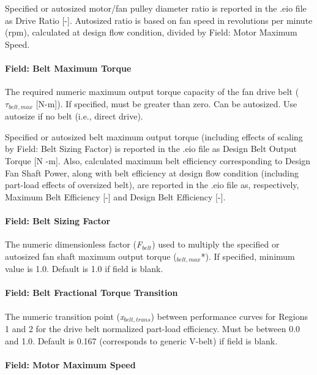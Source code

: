 Specified or autosized motor/fan pulley diameter ratio is reported in the .eio file as Drive Ratio {[}-{]}. Autosized ratio is based on fan speed in revolutions per minute (rpm), calculated at design flow condition, divided by Field: Motor Maximum Speed.

\paragraph{Field: Belt Maximum Torque}\label{field-belt-maximum-torque}

The required numeric maximum output torque capacity of the fan drive belt (\(\tau_{belt,max}\) {[}N-m{]}). If specified, must be greater than zero. Can be autosized. Use autosize if no belt (i.e., direct drive).

Specified or autosized belt maximum output torque (including effects of scaling by Field: Belt Sizing Factor) is reported in the .eio file as Design Belt Output Torque {[}N -m{]}. Also, calculated maximum belt efficiency corresponding to Design Fan Shaft Power, along with belt efficiency at design flow condition (including part-load effects of oversized belt), are reported in the .eio file as, respectively, Maximum Belt Efficiency {[}-{]} and Design Belt Efficiency {[}-{]}.

\paragraph{Field: Belt Sizing Factor}\label{field-belt-sizing-factor}

The numeric dimensionless factor (\emph{F\(_{belt}\)}) used to multiply the specified or autosized fan shaft maximum output torque (\(_{belt,max}\)*). If specified, minimum value is 1.0. Default is 1.0 if field is blank.

\paragraph{Field: Belt Fractional Torque Transition}\label{field-belt-fractional-torque-transition}

The numeric transition point (\emph{x\(_{belt,trans}\)}) between performance curves for Regions 1 and 2 for the drive belt normalized part-load efficiency. Must be between 0.0 and 1.0. Default is 0.167 (corresponds to generic V-belt) if field is blank.

\paragraph{Field: Motor Maximum Speed}\label{field-motor-maximum-speed}

